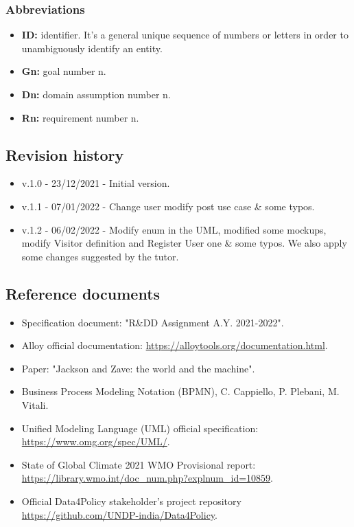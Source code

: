 \subsubsection{Abbreviations}
\begin{itemize}
    \item \textbf{ID:} identifier. It's a general unique sequence of numbers or letters in order to unambiguously identify an entity.
    \item \textbf{Gn:} goal number n.
    \item \textbf{Dn:} domain assumption number n.
    \item \textbf{Rn:} requirement number n.
\end{itemize}

\subsection{Revision history}
\begin{itemize}
    \item v.1.0 - 23/12/2021 - Initial version.
    \item v.1.1 - 07/01/2022 - Change user modify post use case \& some typos.
    \item v.1.2 - 06/02/2022 - Modify enum in the UML, modified some mockups, modify Visitor definition and Register User one \& some typos. We also apply some changes suggested by the tutor.
\end{itemize}
\subsection{Reference documents}
\begin{itemize}
    \item Specification document: "R\&DD Assignment A.Y. 2021-2022".
    \item Alloy official documentation: \href{https://alloytools.org/documentation.html}{https://alloytools.org/documentation.html}.
    \item Paper: "Jackson and Zave: the world and the machine".
    \item Business Process Modeling Notation (BPMN), C. Cappiello, P. Plebani, M. Vitali.
    \item Unified Modeling Language (UML) official specification: \href{https://www.omg.org/spec/UML/}{https://www.omg.org/spec/UML/}.
    \item State of Global Climate 2021 WMO Provisional report: \href{https://library.wmo.int/doc_num.php?explnum_id=10859}{\\https://library.wmo.int/doc\_num.php?explnum\_id=10859}.
    \item Official Data4Policy stakeholder's project repository \href{https://github.com/UNDP-india/Data4Policy}{https://github.com/UNDP-india/Data4Policy}.
\end{itemize}

